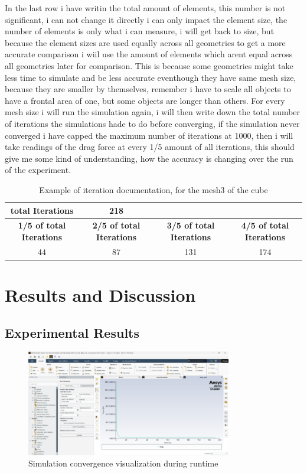 \documentclass[12pt,a4paper]{article}
\begin{document}
In the last row i have writin the total amount of elements, this number is not significant, i can not change it directly i can only impact the element size, the number of elements is only what i can measure, i will get back to size, but because the element sizes are used equally across all geometries to get a more accurate comparison i wiil use the amount of elements which arent equal across all geometries later for comparison. This is because some geometries might take less time to simulate and be less accurate eventhough they have same mesh size, because they are smaller by themselves, remember i have to scale all objects to have a frontal area of one, but some objects are longer than others. For every mesh size i will run the simulation again, i will then write down the total number of iterations the simulations hade to do before converging, if the simulation never converged i have capped the maximum number of iterations at 1000, then i will take readings of the drag force at every 1/5 amount of all iterations, this should give me some kind of understanding, how the accuracy is changing over the run of the experiment.

\begin{table}[H]
\centering
\caption{Example of iteration documentation, for the mesh3 of the cube}
\begin{tabular}{|c|c|c|c|}
\hline
\textbf{total Iterations} & \textbf{218} &  &  \\
\hline
\textbf{1/5 of total Iterations} & \textbf{2/5 of total Iterations} & \textbf{3/5 of total Iterations} & \textbf{4/5 of total Iterations} \\
\hline
44 & 87 & 131 & 174 \\
\hline
\end{tabular}
\end{table}

\section{Results and Discussion}

\subsection{Experimental Results}

\begin{figure}[H]
\centering
\includegraphics[width=0.8\textwidth]{image8.png}
\caption{Simulation convergence visualization during runtime}
\end{figure}
\end{document}
